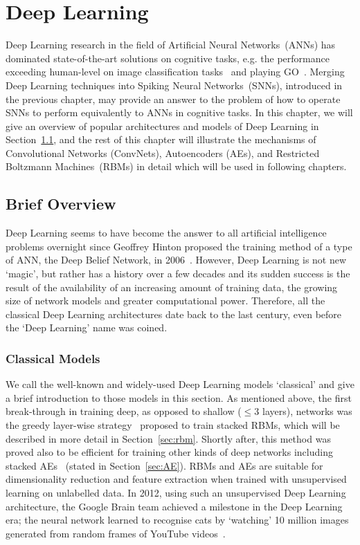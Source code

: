 \chapter{Deep Learning}
\label{cha:dnn}
Deep Learning research in the field of Artificial Neural Networks~(ANNs) has dominated state-of-the-art solutions on cognitive tasks, e.g. the performance exceeding human-level  on image classification tasks~\citep{he2015delving} and playing GO~\citep{silver2016mastering}.
Merging Deep Learning techniques into Spiking Neural Networks~(SNNs), introduced in the previous chapter, may provide an answer to the problem of how to operate SNNs to perform equivalently to ANNs in cognitive tasks. 
In this chapter, we will give an overview of popular architectures and models of Deep Learning in Section~\ref{sec:dl_history}, and the rest of this chapter will illustrate the mechanisms of Convolutional Networks (ConvNets), Autoencoders (AEs), and Restricted Boltzmann Machines~(RBMs) in detail which will be used in following chapters.

\section{Brief Overview}
\label{sec:dl_history}
Deep Learning seems to have become the answer to all artificial intelligence problems overnight since Geoffrey Hinton proposed the training method of a type of ANN, the Deep Belief Network, in 2006~\citep{hinton2006fast}.
However, Deep Learning is not new `magic', but rather has a history over a few decades and its sudden success is the result of the availability of an increasing amount of training data, the growing size of network models and greater computational power.
Therefore, all the classical Deep Learning architectures date back to the last century, even before the `Deep Learning' name was coined.


\subsection{Classical Models}
We call the well-known and widely-used Deep Learning models `classical' and give a brief introduction to those models in this section. 
As mentioned above, the first break-through in training deep, as opposed to shallow ($\le 3$ layers), networks was the greedy layer-wise strategy~\citep{hinton2006fast} proposed to train stacked RBMs, which will be described in more detail in Section~\ref{sec:rbm}.
Shortly after, this method was proved also to be efficient for training other kinds of deep networks including stacked AEs~\citep{bengio2007greedy} (stated in Section~\ref{sec:AE}).
RBMs and AEs are suitable for dimensionality reduction and feature extraction when trained with unsupervised learning on unlabelled data.
In 2012, using such an unsupervised Deep Learning architecture, the Google Brain team achieved a milestone in the Deep Learning era; the neural network learned to recognise cats by `watching' 10 million images generated from random frames of YouTube videos~\citep{le2013building}.

